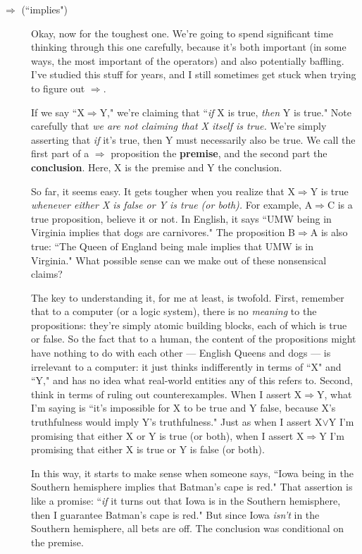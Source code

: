 \begin{description}
\item[$\Rightarrow$ (``implies")] Okay, now for the toughest one. We're
going to spend significant time thinking through this one carefully,
because it's both important (in some ways, the most important of the
operators) and also potentially baffling. I've studied this stuff for
years, and I still sometimes get stuck when trying to figure out
$\Rightarrow$.

If we say ``X$\Rightarrow$Y," we're claiming that ``\textit{if} X is true,
\textit{then} Y is true." Note carefully that \textit{we are not claiming
that X itself is true.} We're simply asserting that \textit{if} it's true,
then Y must necessarily also be true. We call the first part of a
$\Rightarrow$ proposition the \textbf{premise}, and the second part the
\textbf{conclusion}. Here, X is the premise and Y the conclusion.

So far, it seems easy. It gets tougher when you realize that
X$\Rightarrow$Y is true \textit{whenever either X is false or Y is true
(or both).} For example, A$\Rightarrow$C is a true proposition, believe
it or not. In English, it says ``UMW being in Virginia implies that dogs
are carnivores." The proposition B$\Rightarrow$A is also true: ``The
Queen of England being male implies that UMW is in Virginia." What possible
sense can we make out of these nonsensical claims?

The key to understanding it, for me at least, is twofold. First, remember
that to a computer (or a logic system), there is no \textit{meaning} to the
propositions: they're simply atomic building blocks, each of which is true
or false. So the fact that to a human, the content of the propositions
might have nothing to do with each other --- English Queens and dogs --- is
irrelevant to a computer: it just thinks indifferently in terms of ``X" and
``Y," and has no idea what real-world entities any of this refers to.
Second, think in terms of ruling out counterexamples. When I assert
X$\Rightarrow$Y, what I'm saying is ``it's impossible for X to be true
and Y false, because X's truthfulness would imply Y's truthfulness." Just
as when I assert X$\vee$Y I'm promising that either X or Y is true (or
both), when I assert X$\Rightarrow$Y I'm promising that either X is true
or Y is false (or both).

In this way, it starts to make sense when someone says, ``Iowa being in
the Southern hemisphere implies that Batman's cape is red." That assertion
is like a promise: ``\textit{if} it turns out that Iowa is in the Southern
hemisphere, then I guarantee Batman's cape is red." But since Iowa
\textit{isn't} in the Southern hemisphere, all bets are off. The
conclusion was conditional on the premise.


\end{description}
